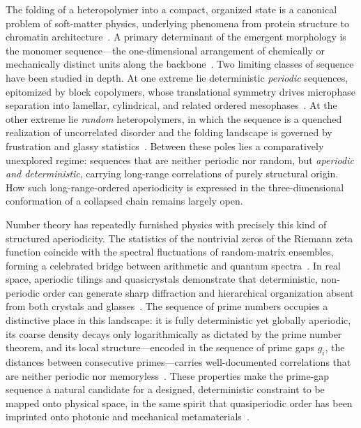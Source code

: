 \documentclass[11pt]{article}
\begin{document}
The folding of a heteropolymer into a compact, organized state is a canonical
problem of soft-matter physics, underlying phenomena from protein structure to
chromatin architecture~\cite{deGennes,LiebermanAiden}. A primary determinant of
the emergent morphology is the monomer sequence---the one-dimensional arrangement
of chemically or mechanically distinct units along the
backbone~\cite{Pande}. Two limiting classes of sequence have been studied in
depth. At one extreme lie deterministic \emph{periodic} sequences, epitomized by
block copolymers, whose translational symmetry drives microphase separation into
lamellar, cylindrical, and related ordered mesophases~\cite{Leibler,Bates}. At the
other extreme lie \emph{random} heteropolymers, in which the sequence is a quenched
realization of uncorrelated disorder and the folding landscape is governed by
frustration and glassy statistics~\cite{Bryngelson,Garel}. Between these poles lies
a comparatively unexplored regime: sequences that are neither periodic nor random,
but \emph{aperiodic and deterministic}, carrying long-range correlations of purely
structural origin. How such long-range-ordered aperiodicity is expressed in the
three-dimensional conformation of a collapsed chain remains largely open.

Number theory has repeatedly furnished physics with precisely this kind of
structured aperiodicity. The statistics of the nontrivial zeros of the Riemann
zeta function coincide with the spectral fluctuations of random-matrix ensembles,
forming a celebrated bridge between arithmetic and quantum
spectra~\cite{Montgomery,BerryKeating}. In real space, aperiodic tilings and
quasicrystals demonstrate that deterministic, non-periodic order can generate sharp
diffraction and hierarchical organization absent from both crystals and
glasses~\cite{Shechtman,Levine}. The sequence of prime numbers occupies a
distinctive place in this landscape: it is fully deterministic yet globally
aperiodic, its coarse density decays only logarithmically as dictated by the prime
number theorem, and its local structure---encoded in the sequence of prime gaps
$g_i$, the distances between consecutive primes---carries well-documented
correlations that are neither periodic nor memoryless~\cite{HardyWright,Cramer}.
These properties make the prime-gap sequence a natural candidate for a designed,
deterministic constraint to be mapped onto physical space, in the same spirit that
quasiperiodic order has been imprinted onto photonic and mechanical
metamaterials~\cite{Macia}.
\end{document}
